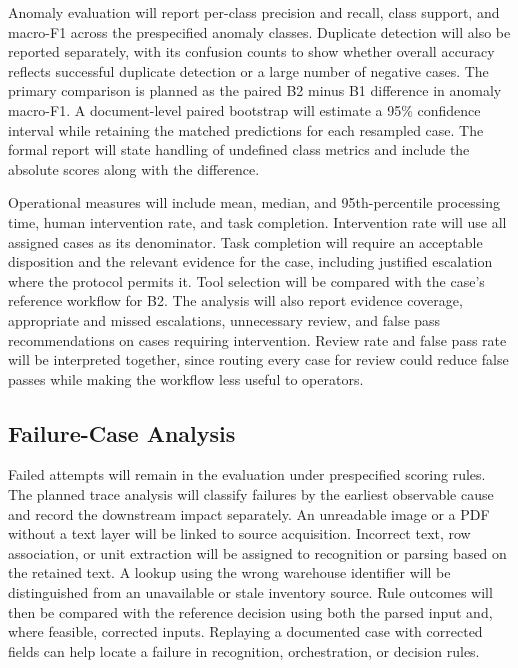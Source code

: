 \documentclass[conference]{IEEEtran}
\begin{document}
Anomaly evaluation will report per-class precision and recall, class support, and macro-F1 across the prespecified anomaly classes. Duplicate detection will also be reported separately, with its confusion counts to show whether overall accuracy reflects successful duplicate detection or a large number of negative cases. The primary comparison is planned as the paired B2 minus B1 difference in anomaly macro-F1. A document-level paired bootstrap will estimate a 95\% confidence interval while retaining the matched predictions for each resampled case. The formal report will state handling of undefined class metrics and include the absolute scores along with the difference.

Operational measures will include mean, median, and 95th-percentile processing time, human intervention rate, and task completion. Intervention rate will use all assigned cases as its denominator. Task completion will require an acceptable disposition and the relevant evidence for the case, including justified escalation where the protocol permits it. Tool selection will be compared with the case's reference workflow for B2. The analysis will also report evidence coverage, appropriate and missed escalations, unnecessary review, and false pass recommendations on cases requiring intervention. Review rate and false pass rate will be interpreted together, since routing every case for review could reduce false passes while making the workflow less useful to operators.

\subsection{Failure-Case Analysis}
Failed attempts will remain in the evaluation under prespecified scoring rules. The planned trace analysis will classify failures by the earliest observable cause and record the downstream impact separately. An unreadable image or a PDF without a text layer will be linked to source acquisition. Incorrect text, row association, or unit extraction will be assigned to recognition or parsing based on the retained text. A lookup using the wrong warehouse identifier will be distinguished from an unavailable or stale inventory source. Rule outcomes will then be compared with the reference decision using both the parsed input and, where feasible, corrected inputs. Replaying a documented case with corrected fields can help locate a failure in recognition, orchestration, or decision rules.
\end{document}
